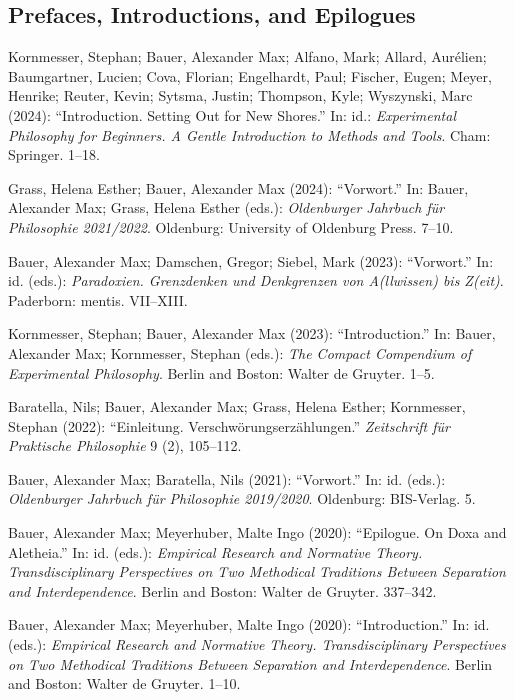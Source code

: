 \documentclass[a4paper,10pt]{article}
\newenvironment{literature}{%
   \parskip6pt\parindent0pt\raggedright
   \def\lititem{\hangindent=1cm\hangafter1}}{%
   \par\ignorespaces}
\begin{document}
\subsection*{Prefaces, Introductions, and Epilogues}
\begin{literature}
\lititem Kornmesser, Stephan; Bauer, Alexander Max; Alfano, Mark; Allard, Aurélien; Baumgartner, Lucien; Cova, Florian; Engelhardt, Paul; Fischer, Eugen; Meyer, Henrike; Reuter, Kevin; Sytsma, Justin; Thompson, Kyle; Wyszynski, Marc (2024): \enquote{Introduction. Setting Out for New Shores.} In: id.: \textit{Experimental Philosophy for Beginners. A Gentle Introduction to Methods and Tools}. Cham: Springer. 1--18.

\lititem Grass, Helena Esther; Bauer, Alexander Max (2024): \enquote{Vorwort.} In: Bauer, Alexander Max; Grass, Helena Esther (eds.): \textit{Oldenburger Jahrbuch für Philosophie 2021/2022}. Oldenburg: University of Oldenburg Press. 7--10.

\lititem Bauer, Alexander Max; Damschen, Gregor; Siebel, Mark (2023): \enquote{Vorwort.} In: id. (eds.): \textit{Paradoxien. Grenzdenken und Denkgrenzen von A(llwissen) bis Z(eit)}. Paderborn: mentis. VII--XIII.

\lititem Kornmesser, Stephan; Bauer, Alexander Max (2023): \enquote{Introduction.} In: Bauer, Alexander Max; Kornmesser, Stephan (eds.): \textit{The Compact Compendium of Experimental Philosophy}. Berlin and Boston: Walter de Gruyter. 1--5.

\lititem Baratella, Nils; Bauer, Alexander Max; Grass, Helena Esther; Kornmesser, Stephan (2022): \enquote{Einleitung. Verschwörungserzählungen.} \textit{Zeitschrift für Praktische Philosophie} 9 (2), 105--112.

\lititem Bauer, Alexander Max; Baratella, Nils (2021): \enquote{Vorwort.} In: id. (eds.): \textit{Oldenburger Jahrbuch für Philosophie 2019/2020}. Oldenburg: BIS-Verlag. 5.

\lititem Bauer, Alexander Max; Meyerhuber, Malte Ingo (2020): \enquote{Epilogue. On Doxa and Aletheia.} In: id. (eds.): \textit{Empirical Research and Normative Theory. Transdisciplinary Perspectives on Two Methodical Traditions Between Separation and Interdependence}. Berlin and Boston: Walter de Gruyter. 337--342.

\lititem Bauer, Alexander Max; Meyerhuber, Malte Ingo (2020): \enquote{Introduction.} In: id. (eds.): \textit{Empirical Research and Normative Theory. Transdisciplinary Perspectives on Two Methodical Traditions Between Separation and Interdependence}. Berlin and Boston: Walter de Gruyter. 1--10.


\end{literature}
\end{document}
